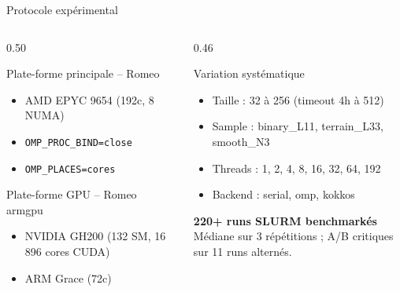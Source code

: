 \documentclass[aspectratio=169,11pt]{beamer}
\begin{document}
\begin{frame}{Protocole expérimental}
\begin{columns}[T]
\begin{column}{0.50\textwidth}
\begin{block}{Plate-forme principale -- Romeo}
\begin{itemize}
\footnotesize
    \item AMD EPYC 9654 (192c, 8 NUMA)
    \item \texttt{OMP\_PROC\_BIND=close}
    \item \texttt{OMP\_PLACES=cores}
\end{itemize}
\end{block}

\begin{block}{Plate-forme GPU -- Romeo armgpu}
\begin{itemize}
\footnotesize
    \item NVIDIA GH200 (132 SM, 16\,896 cores CUDA)
    \item ARM Grace (72c)
\end{itemize}
\end{block}
\end{column}
\begin{column}{0.46\textwidth}
\begin{block}{Variation systématique}
\begin{itemize}
\footnotesize
    \item Taille : 32 à 256 (timeout 4h à 512)
    \item Sample : binary\_L11, terrain\_L33, smooth\_N3
    \item Threads : 1, 2, 4, 8, 16, 32, 64, 192
    \item Backend : serial, omp, kokkos
\end{itemize}
\end{block}

\vspace{0.2cm}
\textbf{220+ runs SLURM benchmarkés}\\
{\footnotesize Médiane sur 3 répétitions ; A/B critiques sur 11 runs alternés.}
\end{column}
\end{columns}
\end{frame}
\end{document}
